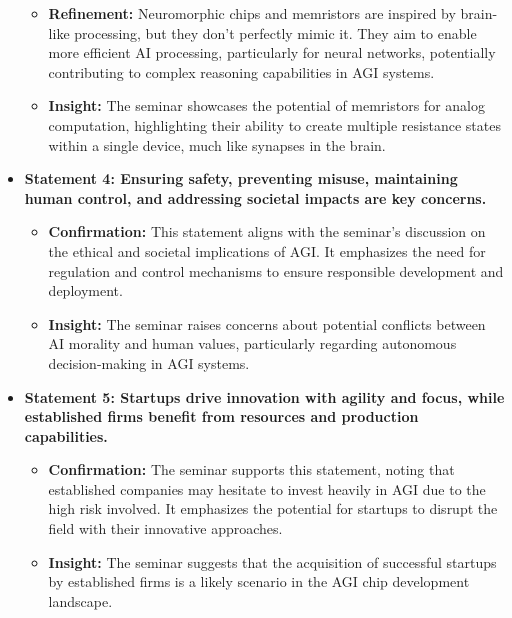 \documentclass[
]{article}
\begin{document}
\begin{itemize}
  \begin{itemize}
  
  \item
    \textbf{Refinement:} Neuromorphic chips and memristors are inspired
    by brain-like processing, but they don't perfectly mimic it. They
    aim to enable more efficient AI processing, particularly for neural
    networks, potentially contributing to complex reasoning capabilities
    in AGI systems.
  \item
    \textbf{Insight:} The seminar showcases the potential of memristors
    for analog computation, highlighting their ability to create
    multiple resistance states within a single device, much like
    synapses in the brain.
  \end{itemize}
\item
  \textbf{Statement 4: Ensuring safety, preventing misuse, maintaining
  human control, and addressing societal impacts are key concerns.}

  \begin{itemize}
  
  \item
    \textbf{Confirmation:} This statement aligns with the seminar's
    discussion on the ethical and societal implications of AGI. It
    emphasizes the need for regulation and control mechanisms to ensure
    responsible development and deployment.
  \item
    \textbf{Insight:} The seminar raises concerns about potential
    conflicts between AI morality and human values, particularly
    regarding autonomous decision-making in AGI systems.
  \end{itemize}
\item
  \textbf{Statement 5: Startups drive innovation with agility and focus,
  while established firms benefit from resources and production
  capabilities.}

  \begin{itemize}
  
  \item
    \textbf{Confirmation:} The seminar supports this statement, noting
    that established companies may hesitate to invest heavily in AGI due
    to the high risk involved. It emphasizes the potential for startups
    to disrupt the field with their innovative approaches.
  \item
    \textbf{Insight:} The seminar suggests that the acquisition of
    successful startups by established firms is a likely scenario in the
    AGI chip development landscape.
  \end{itemize}
\end{itemize}
\end{document}
